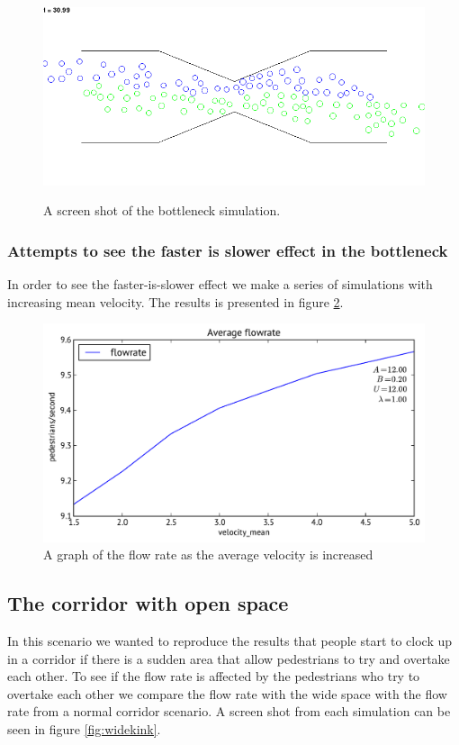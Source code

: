 \begin{figure}[h]
\centering
{\includegraphics[scale=0.35]{Figures/bottleneck.png}}
\caption{A screen shot of the bottleneck simulation.}
\label{fig:bottleneckbidirec}
\end{figure}

\subsubsection{Attempts to see the faster is slower effect in the bottleneck}
In order to see the faster-is-slower effect we make a series of simulations 
with increasing mean velocity. The results is presented in figure 
\ref{fig:is-faster-slower-in-bottleneck}.

\begin{figure}[h]
\centering
\includegraphics[scale=0.45]{Figures/Wide-kink-one-directional-flowrate-agg.pdf}
\caption{A graph of the flow rate as the average velocity is increased}
\label{fig:is-faster-slower-in-bottleneck}
\end{figure}

\subsection{The corridor with open space}
In this scenario we wanted to reproduce the results that people start to 
clock up in a corridor if there is a sudden area that allow pedestrians to try 
and overtake each other. To see if the flow rate is affected by the pedestrians 
who try to overtake each other we compare the flow rate with the wide space with 
the flow rate from a normal corridor scenario. A screen shot from each simulation 
can be seen in figure \ref{fig:widekink}.

